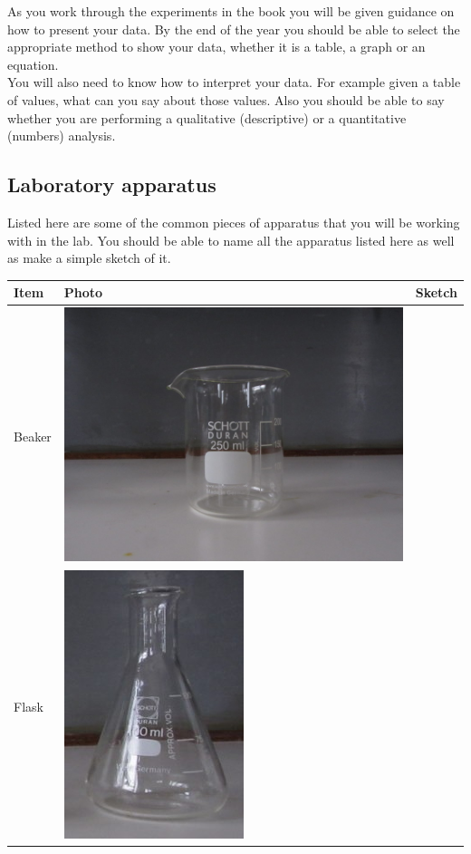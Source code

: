 \begin{enumerate}[label=\textbf{\arabic*}.]
As you work through the experiments in the book you will be given guidance on how to present your data. By the end of the year you should be able to select the appropriate method to show your data, whether it is a table, a graph or an equation.\\
You will also need to know how to interpret your data. For example given a table of values, what can you say about those values. Also you should be able to say whether you are performing a qualitative (descriptive) or a quantitative (numbers) analysis. 
\subsection*{Laboratory apparatus}
Listed here are some of the common pieces of apparatus that you will be working with in the lab. You should be able to name all the apparatus listed here as well as make a simple sketch of it. 
\begin{table}[H]
 \begin{center}
  \begin{tabular}{|l|m{3cm}|m{3cm}|}\hline
   \textbf{Item} & \textbf{Photo} & \textbf{Sketch} \\ \hline
Beaker & \includegraphics[width=.2\textwidth]{photos/beaker.jpg} & \scalebox{.4}{\begin{pspicture}(0,0)(5,5) \pstTubeEssais[glassType=becher] \end{pspicture}} \\ \hline
Flask & \includegraphics[width=.05\textheight]{photos/flask.JPG} & \scalebox{.4}{\begin{pspicture}(0,0)(5,5) \pstTubeEssais[glassType=erlen] \end{pspicture}} \\ \hline

\end{tabular}
\end{center}
\end{table}
\end{enumerate}

